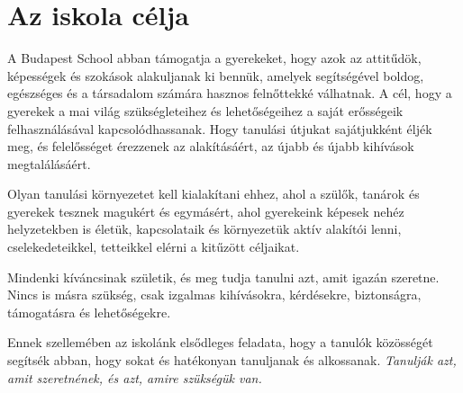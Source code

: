 \section{Az iskola célja}
\label{sec:iskola_celja}

A Budapest School abban támogatja a gyerekeket, hogy azok az
attitűdök, képességek és szokások alakuljanak ki bennük, amelyek segítségével
boldog, egészséges és a társadalom számára hasznos felnőttekké válhatnak. A
cél, hogy a gyerekek a mai világ szükségleteihez és lehetőségeihez a saját
erősségeik felhasználásával kapcsolódhassanak.	Hogy tanulási útjukat
sajátjukként éljék meg, és felelősséget érezzenek az alakításáért, az újabb és
újabb kihívások megtalálásáért.

Olyan tanulási környezetet kell kialakítani ehhez, ahol a szülők, tanárok és
gyerekek tesznek magukért és egymásért, ahol gyerekeink képesek nehéz
helyzetekben is életük, kapcsolataik és környezetük aktív alakítói lenni,
cselekedeteikkel, tetteikkel elérni a kitűzött céljaikat.

Mindenki kíváncsinak születik, és meg tudja tanulni azt, amit
igazán szeretne. Nincs is másra szükség, csak izgalmas kihívásokra, kérdésekre,
biztonságra, támogatásra és lehetőségekre.

Ennek szellemében az iskolánk elsődleges feladata, hogy a tanulók közösségét
segítsék abban, hogy sokat és hatékonyan tanuljanak és alkossanak.
\emph{Tanulják azt, amit szeretnének, és azt, amire szükségük van.}
